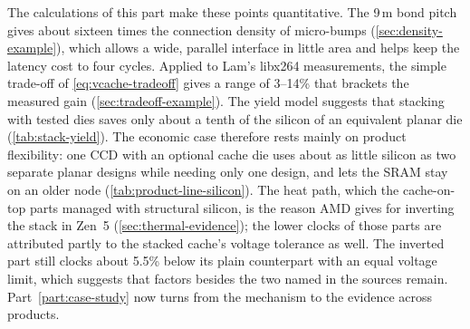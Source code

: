 The calculations of this part make these points quantitative. The 9\,\textmu m bond pitch gives about sixteen times the connection density of micro-bumps (\cref{sec:density-example}), which allows a wide, parallel interface in little area and helps keep the latency cost to four cycles. Applied to Lam's libx264 measurements, the simple trade-off of \cref{eq:vcache-tradeoff} gives a range of 3--14\% that brackets the measured gain (\cref{sec:tradeoff-example}). The yield model suggests that stacking with tested dies saves only about a tenth of the silicon of an equivalent planar die (\cref{tab:stack-yield}). The economic case therefore rests mainly on product flexibility: one CCD with an optional cache die uses about as little silicon as two separate planar designs while needing only one design, and lets the SRAM stay on an older node (\cref{tab:product-line-silicon}). The heat path, which the cache-on-top parts managed with structural silicon, is the reason AMD gives for inverting the stack in Zen~5 (\cref{sec:thermal-evidence}); the lower clocks of those parts are attributed partly to the stacked cache's voltage tolerance as well. The inverted part still clocks about 5.5\% below its plain counterpart with an equal voltage limit, which suggests that factors besides the two named in the sources remain. Part~\ref{part:case-study} now turns from the mechanism to the evidence across products.
